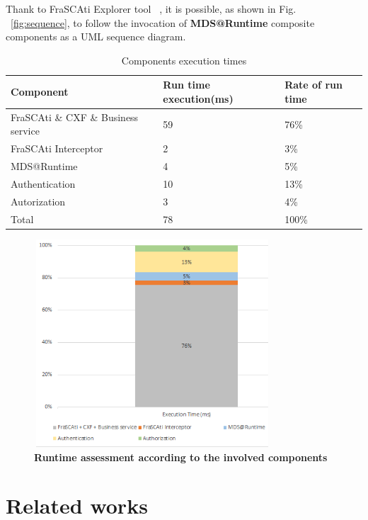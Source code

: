 \documentclass[runningheads,a4paper]{llncs}
\begin{document}
Thank to FraSCAti Explorer tool ~\cite{SMF09}, it is possible, as shown in Fig. ~\ref{fig:sequence}, to follow the invocation of  \textbf{MDS@Runtime} composite components as a UML sequence diagram.


\begin{table}

\caption{Components execution times}
\begin{tabular}{@{}*{3}{|p{3.1cm}}|@{} }
\hline
Component & Run time execution(ms)   & Rate of run time \\[0.2cm]
  \hline
  FraSCAti \& CXF \& Business service & 59&  76\%\\
 FraSCAti Interceptor & 2&  3\%\\ 
 MDS@Runtime & 4&  5\%\\
 Authentication& 10& 13\%\\
 Autorization & 3& 4\%\\
 \hline
   Total & 78& 100\%\\
    \hline

\end{tabular}
\end{table}


\begin{figure}[ht]  
\centering
\includegraphics[height=220pt, width=250pt]{runtimeAssessment1.PNG}
\caption{\textbf{Runtime assessment according to the involved components
}}
\label{fig:SecaaS}
\end{figure}








\section{Related works}
\end{document}
